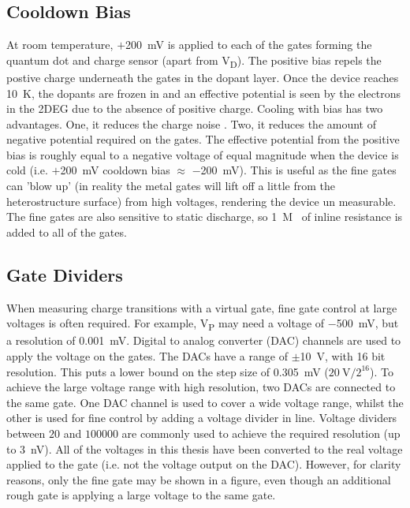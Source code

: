\subsection{Cooldown Bias}
At room temperature, $+$\qty{200}{mV} is applied to each of the gates forming the quantum dot and charge sensor (apart from V\textsubscript{D}). The positive bias repels the postive charge underneath the gates in the dopant layer. Once the device reaches \qty{10}{K}, the dopants are frozen in and an effective potential is seen by the electrons in the 2DEG due to the absence of positive charge. Cooling with bias has two advantages. One, it reduces the charge noise \cite{bias_cooling}. Two, it reduces the amount of negative potential required on the gates. The effective potential from the positive bias is roughly equal to a negative voltage of equal magnitude when the device is cold (i.e. $+$\qty{200}{mV} cooldown bias $\approx$ $-$\qty{200}{mV}). This is useful as the fine gates can 'blow up' (in reality the metal gates will lift off a little from the heterostructure surface) from high voltages, rendering the device un measurable. The fine gates are also sensitive to static discharge, so \qty{1}{M\Omega} of inline resistance is added to all of the gates.   

\subsection{Gate Dividers}
When measuring charge transitions with a virtual gate, fine gate control at large voltages is often required. For example, V\textsubscript{P} may need a voltage of $-$\qty{500}{mV}, but a resolution of \qty{0.001}{mV}. Digital to analog converter (DAC) channels are used to apply the voltage on the gates. The DACs have a range of $\pm$\qty{10}{V}, with 16 bit resolution. This puts a lower bound on the step size of \qty{0.305}{mV} ($\mathrm{\qty{20}{V}/2^{16}}$). To achieve the large voltage range with high resolution, two DACs are connected to the same gate. One DAC channel is used to cover a wide voltage range, whilst the other is used for fine control by adding a voltage divider in line. Voltage dividers between $20$ and $100000$ are commonly used to achieve the required resolution (up to \qty{3}{nV}). All of the voltages in this thesis have been converted to the real voltage applied to the gate (i.e. not the voltage output on the DAC). However, for clarity reasons, only the fine gate may be shown in a figure, even though an additional rough gate is applying a large voltage to the same gate. 













